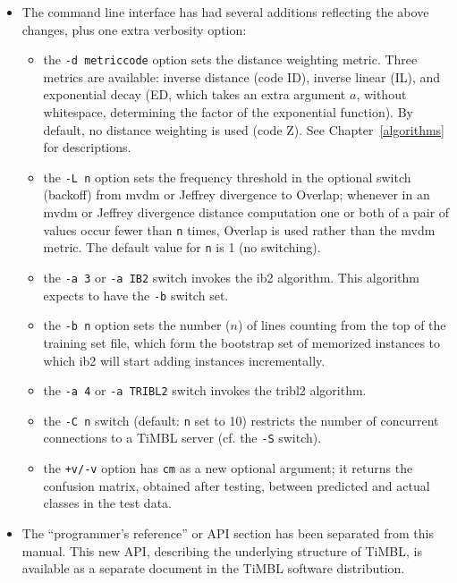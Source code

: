 \documentclass{book}
\begin{document}
\begin{itemize}
\item The command line interface has had several additions reflecting
the above changes, plus one extra verbosity option:

\begin{itemize} 
	\item the {\tt -d metriccode} option sets the distance
          weighting metric. Three metrics are available: inverse
          distance (code ID), inverse linear (IL), and exponential
          decay (ED, which takes an extra argument $a$, without
          whitespace, determining the factor of the exponential
          function). By default, no distance weighting is used (code
          Z). See Chapter~\ref{algorithms} for descriptions.
        \item the {\tt -L n} option sets the frequency threshold in
          the optional switch (backoff) from {\sc mvdm} or Jeffrey
          divergence to Overlap; whenever in an {\sc mvdm} or Jeffrey
          divergence distance computation one or both of a pair of
          values occur fewer than {\tt n} times, Overlap is used
          rather than the {\sc mvdm} metric.  The default value for
          {\tt n} is 1 (no switching).
	\item the {\tt -a 3} or {\tt -a IB2} switch invokes the 
              {\sc ib2} algorithm. This algorithm expects to have 
              the {\tt -b} switch set.
	\item the {\tt -b n} option sets the number ($n$) of lines
              counting from the top of the training set file, which form
              the bootstrap set of memorized instances to which {\sc ib2} 
              will start adding instances incrementally.
	\item the {\tt -a 4} or {\tt -a TRIBL2} switch invokes the 
              {\sc tribl2} algorithm.
        \item the {\tt -C n} switch (default: {\tt n} set to 10) restricts
              the number of concurrent connections to a TiMBL server
              (cf. the {\tt -S} switch).
	\item the {\tt +v/-v} option has {\tt cm} as a new optional
              argument; it returns the confusion matrix, obtained
              after testing, between predicted and actual classes in 
              the test data.
\end{itemize}

\item The ``programmer's reference'' or API section has been separated
  from this manual. This new API, describing the underlying structure
  of TiMBL, is available as a separate document in the TiMBL software
  distribution.


\end{itemize}
\end{document}
